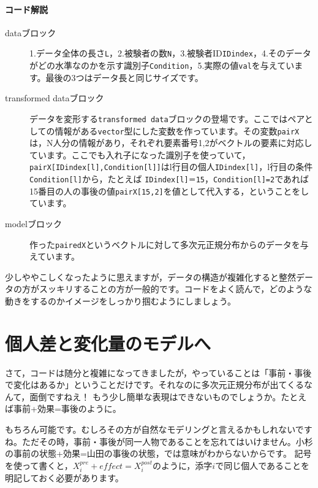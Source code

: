 \documentclass{ltjsbook}
\begin{document}
\paragraph{コード解説}
\begin{description}
    \item[dataブロック] 1.データ全体の長さ\verb|L|，2.被験者の数\verb|N|，3.被験者ID\verb|IDindex|，4.そのデータがどの水準なのかを示す識別子\verb|Condition|，5.実際の値\verb|val|を与えています。最後の3つはデータ長と同じサイズです。
    \item[transformed dataブロック] データを変形する\verb|transformed data|ブロックの登場です。ここではペアとしての情報がある\verb|vector|型にした変数を作っています。その変数\verb|pairX|は，N人分の情報があり，それぞれ要素番号1,2がベクトルの要素に対応しています。ここでも入れ子になった識別子を使っていて，\verb|pairX[IDindex[l],Condition[l]]|はl行目の個人\verb|IDindex[l]|，l行目の条件\verb|Condition[l]|から，たとえば \verb|IDindex[l]＝15|，\verb|Condition[l]=2|であれば15番目の人の事後の値\verb|pairX[15,2]|を値として代入する，ということをしています。
    \item[modelブロック] 作った\verb|pairedX|というベクトルに対して多次元正規分布からのデータを与えています。
\end{description}

少しややこしくなったように思えますが，データの構造が複雑化すると整然データの方がスッキリすることの方が一般的です。コードをよく読んで，どのような動きをするのかイメージをしっかり掴むようにしましょう。

\section{個人差と変化量のモデルへ}
さて，コードは随分と複雑になってきましたが，やっていることは「事前・事後で変化はあるか」ということだけです。それなのに多次元正規分布が出てくるなんて，面倒ですねえ！
もう少し簡単な表現はできないものでしょうか。たとえば事前+効果=事後のように。

もちろん可能です。むしろその方が自然なモデリングと言えるかもしれないですね。ただその時，事前・事後が同一人物であることを忘れてはいけません。小杉の事前の状態+効果=山田の事後の状態，では意味がわからないからです。
記号を使って書くと，$X_i^{pre}+effect = X_i^{post}$のように，添字$i$で同じ個人であることを明記しておく必要があります。
\end{document}
